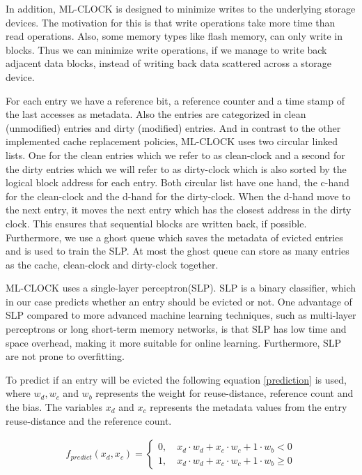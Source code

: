 \documentclass[
	12pt,
	a4paper,
	abstract,
	bibliography=totoc,
	chapterprefix,
	headings=openright,
	numbers=endperiod,
	parskip=half,
	twoside,
]{scrreprt}
\begin{document}
In addition, ML-CLOCK is designed to minimize writes to the underlying storage devices.
The motivation for this is that write operations take more time than read operations.
Also, some memory types like flash memory, can only write in blocks.
Thus we can minimize write operations, if we manage to write back adjacent data blocks, 
instead of writing back data scattered across a storage device.

For each entry we have a reference bit, a reference counter and a time stamp of the 
last accesses as metadata. 
Also the entries are categorized in clean (unmodified) entries and dirty (modified) entries.
And in contrast to the other implemented cache replacement policies,
ML-CLOCK uses two circular linked lists.
One for the clean entries which we refer to as clean-clock 
and a second for the dirty entries which we will refer to as dirty-clock
which is also sorted by the logical block address for each entry.
Both circular list have one hand, the c-hand for the clean-clock and 
the d-hand for the dirty-clock.
When the d-hand move to the next entry, it moves the next entry 
which has the closest address in the dirty clock.
This ensures that sequential blocks are written back, if possible.
Furthermore, we use a ghost queue which saves the metadata of evicted entries and 
is used to train the SLP.
At most the ghost queue can store as many entries as the cache, clean-clock and dirty-clock together.

ML-CLOCK uses a single-layer perceptron(SLP).
SLP is a binary classifier, which in our case predicts whether an entry should be evicted or not.
One advantage of SLP compared to more advanced machine learning techniques, such 
as multi-layer perceptrons or long short-term memory networks, is that
SLP has low time and space overhead,
making it more suitable for online learning.
Furthermore, SLP are not prone to overfitting.

To predict if an entry will be evicted the following equation \ref{prediction} is used,\\
where $w_d, w_c$ and $w_b$ represents the weight for reuse-distance, reference count and the bias.
The variables $x_d$ and $x_c$ represents the metadata values from the entry reuse-distance and the reference count.

\begin{align}
	f_{predict} (x_d, x_c) =
	\begin{cases}
		0, \quad x_d \cdot w_d + x_c \cdot w_c + 1 \cdot w_b < 0 \\
		1, \quad x_d \cdot w_d + x_c \cdot w_c + 1 \cdot w_b \geq 0 \label{prediction}
	\end{cases}
\end{align}
\end{document}
